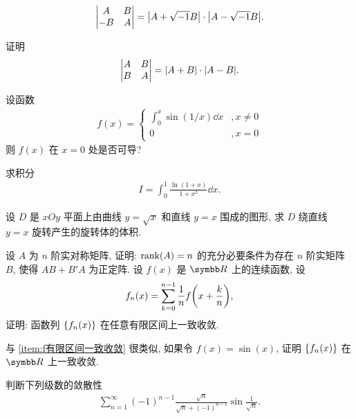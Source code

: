 \begin{exercise}[resume=exer]
\begin{exercise}
\begin{align*}
\begin{vmatrix}
                    A & B \\ -B & A
                \end{vmatrix} = \abs{A + \sqrt{-1}B}\cdot\abs{A - \sqrt{-1}B}.
            \end{align*}
            \item 证明 
            \begin{align*}
                \begin{vmatrix}
                    A & B \\ B & A
                \end{vmatrix} = \abs{A + B}\cdot\abs{A - B}.
            \end{align*}
        \end{exercise}
        \item 设函数 
        \begin{align*}
            f(x) = \begin{cases}
                \int_{0}^{x}\sin(1/x) \dd{x} & ,x \ne 0\\
                0 & ,x = 0
            \end{cases}
        \end{align*}
        则 $ f(x) $ 在 $ x = 0 $ 处是否可导?
        \item 求积分
        \begin{align*}
            I = \int_{0}^{1} \frac{\ln(1 + x)}{1 + x^{2}} \dd{x}.
        \end{align*}
        \item 设 $ D $ 是 $ xOy $ 平面上由曲线 $ y = \sqrt{x} $ 和直线 $ y = x $ 围成的图形, 求 $ D $ 绕直线 $ y = x $ 旋转产生的旋转体的体积.
        \item 设 $ A $ 为 $ n $ 阶实对称矩阵, 证明: $ \rank(A) = n $ 的充分必要条件为存在 $ n $ 阶实矩阵 $ B $, 使得 $ AB + B'A $ 为正定阵.
        \sitem\label{item:f有限区间一致收敛} 设 $ f(x) $ 是 $ \R $ 上的连续函数, 设
        \begin{align*}
            f_{n}(x) = \sum_{k=0}^{n-1}\frac{1}{n}f\qty(x+\frac{k}{n}),
        \end{align*} 
        证明: 函数列 $ \qty{f_{n}(x)} $ 在任意有限区间上一致收敛. 
        \item 与 \ref{item:f有限区间一致收敛} 很类似, 如果令 $ f(x) = \sin(x) $, 证明 $ \qty{f_{n}(x)} $ 在 $ \R $ 上一致收敛. 
        \item 判断下列级数的敛散性
        \begin{align*}
            \sum_{n = 1}^{\infty} (-1)^{n - 1} \frac{\sqrt{n}}{\sqrt{n} + (-1)^{n-1}}\sin\frac{1}{\sqrt{n}}.

\end{align*}
\end{exercise}
